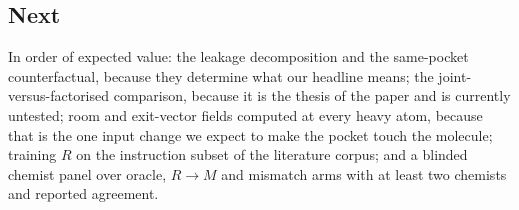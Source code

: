 \subsection{Next}

In order of expected value: the leakage decomposition and the same-pocket counterfactual, because
they determine what our headline means; the joint-versus-factorised comparison, because it is the
thesis of the paper and is currently untested; room and exit-vector fields computed at every heavy
atom, because that is the one input change we expect to make the pocket touch the molecule; training
$R$ on the instruction subset of the literature corpus; and a blinded chemist panel over
oracle, $R\!\rightarrow\!M$ and mismatch arms with at least two chemists and reported agreement.
